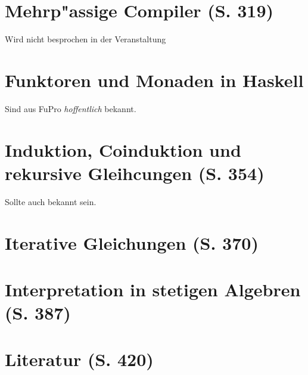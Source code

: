 \documentclass[11pt]{article}
\begin{document}
\section{Mehrp"assige Compiler (S. 319)}
\label{sec-14}
Wird nicht besprochen in der Veranstaltung

\section{Funktoren und Monaden in Haskell}
\label{sec-15}
Sind aus FuPro \emph{hoffentlich} bekannt.

\section{Induktion, Coinduktion und rekursive Gleihcungen (S. 354)}
\label{sec-16}
Sollte auch bekannt sein.

\section{Iterative Gleichungen (S. 370)}
\label{sec-17}

\section{Interpretation in stetigen Algebren (S. 387)}
\label{sec-18}

\section{Literatur (S. 420)}
\label{sec-19}
\end{document}
